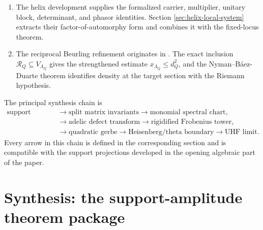 \documentclass[11pt]{amsart}
\numberwithin{equation}{section}
\theoremstyle{definition}
\newcommand{\cR}{\mathcal R}
\begin{document}
\begin{enumerate}[label=\textup{(\arabic*)},leftmargin=3.2em]
\item The helix development \cite{Lavery} supplies the formalized carrier,
multiplier, unitary block, determinant, and phasor identities.  Section
\ref{sec:helix-local-system} extracts their factor-of-automorphy form and
combines it with the fixed-locus theorem.

\item The reciprocal Beurling refinement originates in \cite{Schultze}.
The exact inclusion $\cR_Q\subseteq V_{\Lambda_Q}$ gives the strengthened
estimate $x_{\Lambda_Q}\leq d_Q^2$, and the Nyman--B\'aez-Duarte theorem
identifies density at the target section with the Riemann hypothesis.
\end{enumerate}

The principal synthesis chain is
\[
\begin{aligned}
\text{support lattice}
&\longrightarrow\text{split matrix invariants}
\longrightarrow\text{monomial spectral chart},\\
&\longrightarrow\text{adelic defect transform}
\longrightarrow\text{rigidified Frobenius tower},\\
&\longrightarrow\text{quadratic gerbe}
\longrightarrow\text{Heisenberg/theta boundary}
\longrightarrow\text{UHF limit}.
\end{aligned}
\]
Every arrow in this chain is defined in the corresponding section and is
compatible with the support projections developed in the opening algebraic
part of the paper.

\section{Synthesis: the support-amplitude theorem package}
\label{sec:final-synthesis}
\end{document}
